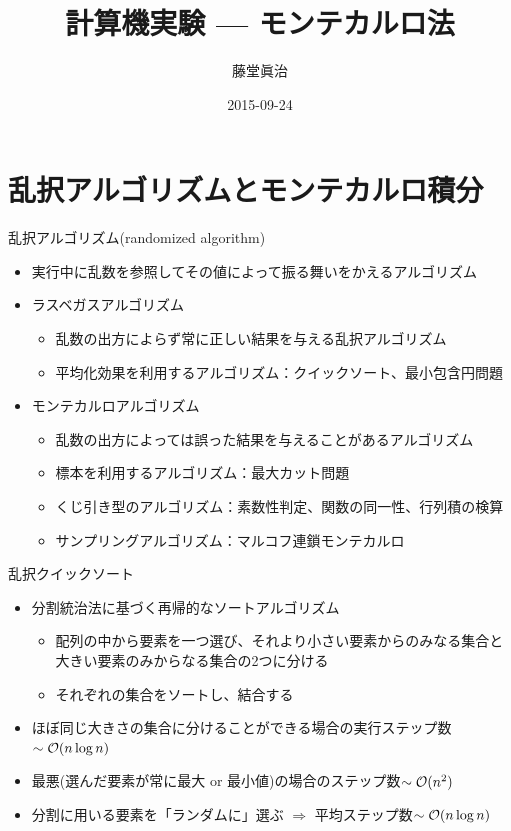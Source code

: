\documentclass[dvipdfmx]{beamer}
\title{計算機実験 --- モンテカルロ法}
\author{藤堂眞治}
\date{2015-09-24}
\begin{document}

\begin{frame}
  \titlepage
  \tableofcontents
\end{frame}

\section{乱択アルゴリズムとモンテカルロ積分}

\begin{frame}[t,fragile]{乱択アルゴリズム(randomized algorithm)}
  \begin{itemize}
  \item 実行中に乱数を参照してその値によって振る舞いをかえるアルゴリズム
  \item ラスベガスアルゴリズム
    \begin{itemize}
    \item 乱数の出方によらず常に正しい結果を与える乱択アルゴリズム
    \item 平均化効果を利用するアルゴリズム：クイックソート、最小包含円問題
    \end{itemize}
  \item モンテカルロアルゴリズム
    \begin{itemize}
    \item 乱数の出方によっては誤った結果を与えることがあるアルゴリズム
    \item 標本を利用するアルゴリズム：最大カット問題
    \item くじ引き型のアルゴリズム：素数性判定、関数の同一性、行列積の検算
    \item サンプリングアルゴリズム：マルコフ連鎖モンテカルロ
    \end{itemize}
  \end{itemize}
\end{frame}

\begin{frame}[t,fragile]{乱択クイックソート}
  \begin{itemize}
    \setlength{\itemsep}{1em}
  \item 分割統治法に基づく再帰的なソートアルゴリズム
    \begin{itemize}
      \item 配列の中から要素を一つ選び、それより小さい要素からのみなる集合と大きい要素のみからなる集合の2つに分ける
      \item それぞれの集合をソートし、結合する
    \end{itemize}
    \item ほぼ同じ大きさの集合に分けることができる場合の実行ステップ数$\sim {\cal O}(n \log n)$
    \item 最悪(選んだ要素が常に最大 or 最小値)の場合のステップ数$\sim {\cal O}(n^2)$
    \item 分割に用いる要素を「ランダムに」選ぶ $\Rightarrow$ 平均ステップ数$\sim {\cal O}(n \log n)$
  \end{itemize}
\end{frame}
\end{document}
